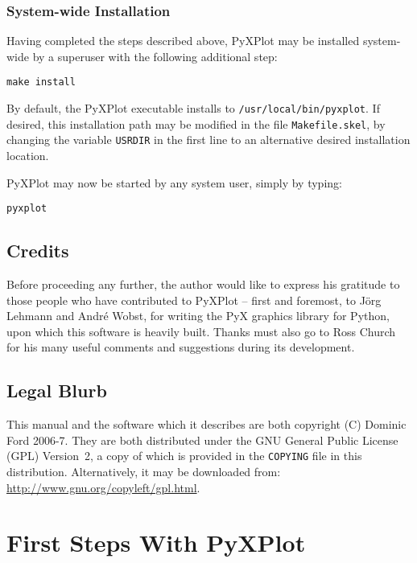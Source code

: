 \documentclass[a4paper,onecolumn,11pt]{book}
\begin{document}
\subsection{System-wide Installation}

Having completed the steps described above, PyXPlot may be installed
system-wide by a superuser with the following additional step:

\begin{verbatim}
make install
\end{verbatim}

By default, the PyXPlot executable installs to \texttt{/usr/local/bin/pyxplot}.
If desired, this installation path may be modified in the file
\texttt{Makefile.skel}, by changing the variable \texttt{USRDIR} in the first
line to an alternative desired installation location.

PyXPlot may now be started by any system user, simply by typing:

\begin{verbatim}
pyxplot
\end{verbatim}

\section{Credits}

Before proceeding any further, the author would like to express his gratitude
to those people who have contributed to PyXPlot -- first and foremost, to
J\"org Lehmann and Andr\'e Wobst, for writing the PyX graphics library for
Python, upon which this software is heavily built. Thanks must also go to Ross
Church for his many useful comments and suggestions during its development.

\section{Legal Blurb}

This manual and the software which it describes are both copyright (C)
Dominic Ford 2006-7. They are both distributed under the GNU General Public
License (GPL) Version~2, a copy of which is provided in the \texttt{COPYING}
file in this distribution. Alternatively, it may
be downloaded from:\\ \url{http://www.gnu.org/copyleft/gpl.html}.

\chapter{First Steps With PyXPlot}
\label{gnuplot_intro}
\end{document}
